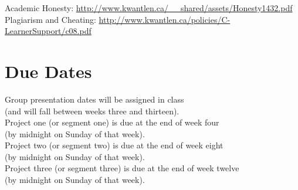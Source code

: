 \documentclass[letterpaper,10pt,headsepline]{scrreprt}
\begin{document}
\noindent
Academic Honesty: \url{http://www.kwantlen.ca/__shared/assets/Honesty1432.pdf}\\
Plagiarism and Cheating: \url{http://www.kwantlen.ca/policies/C-LearnerSupport/c08.pdf}

\section{Due Dates}

Group presentation dates will be assigned in class \\(and will fall between weeks three and thirteen).
\noindent\\
Project one (or segment one) is due at the end of week four \\(by midnight on Sunday of that week).
\noindent\\
Project two (or segment two) is due at the end of week eight \\(by midnight on Sunday of that week).
\noindent\\
Project three (or segment three) is due at the end of week twelve \\(by midnight on Sunday of that week).

\clearpage
\end{document}
